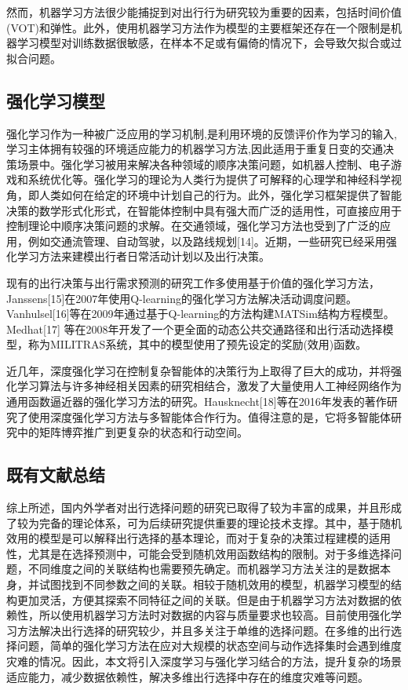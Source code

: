 然而，机器学习方法很少能捕捉到对出行行为研究较为重要的因素，包括时间价值(VOT)和弹性\cite{koushik2020machine}。此外，使用机器学习方法作为模型的主要框架还存在一个限制是机器学习模型对训练数据很敏感，在样本不足或有偏倚的情况下，会导致欠拟合或过拟合问题\cite{singh2016review}。



\subsection{强化学习模型}
强化学习作为一种被广泛应用的学习机制,是利用环境的反馈评价作为学习的输入,学习主体拥有较强的环境适应能力的机器学习方法,因此适用于重复日变的交通决策场景中。强化学习被用来解决各种领域的顺序决策问题，如机器人控制、电子游戏和系统优化等。强化学习的理论为人类行为提供了可解释的心理学和神经科学视角，即人类如何在给定的环境中计划自己的行为。此外，强化学习框架提供了智能决策的数学形式化形式，在智能体控制中具有强大而广泛的适用性，可直接应用于控制理论中顺序决策问题的求解。在交通领域，强化学习方法也受到了广泛的应用，例如交通流管理、自动驾驶，以及路线规划[14]。近期，一些研究已经采用强化学习方法来建模出行者日常活动计划以及出行决策。

现有的出行决策与出行需求预测的研究工作多使用基于价值的强化学习方法，Janssens[15]在2007年使用Q-learning的强化学习方法解决活动调度问题。Vanhulsel[16]等在2009年通过基于Q-learning的方法构建MATSim结构方程模型。Medhat[17] 等在2008年开发了一个更全面的动态公共交通路径和出行活动选择模型，称为MILITRAS系统，其中的模型使用了预先设定的奖励(效用)函数。

近几年，深度强化学习在控制复杂智能体的决策行为上取得了巨大的成功，并将强化学习算法与许多神经相关因素的研究相结合，激发了大量使用人工神经网络作为通用函数逼近器的强化学习方法的研究。Hausknecht[18]等在2016年发表的著作研究了使用深度强化学习方法与多智能体合作行为。值得注意的是，它将多智能体研究中的矩阵博弈推广到更复杂的状态和行动空间。

\subsection{既有文献总结}

综上所述，国内外学者对出行选择问题的研究已取得了较为丰富的成果，并且形成了较为完备的理论体系，可为后续研究提供重要的理论技术支撑。其中，基于随机效用的模型是可以解释出行选择的基本理论，而对于复杂的决策过程建模的适用性，尤其是在选择预测中，可能会受到随机效用函数结构的限制。对于多维选择问题，不同维度之间的关联结构也需要预先确定。而机器学习方法关注的是数据本身，并试图找到不同参数之间的关联。相较于随机效用的模型，机器学习模型的结构更加灵活，方便其探索不同特征之间的关联。但是由于机器学习方法对数据的依赖性，所以使用机器学习方法时对数据的内容与质量要求也较高。目前使用强化学习方法解决出行选择的研究较少，并且多关注于单维的选择问题。在多维的出行选择问题，简单的强化学习方法在应对大规模的状态空间与动作选择集时会遇到维度灾难的情况。因此，本文将引入深度学习与强化学习结合的方法，提升复杂的场景适应能力，减少数据依赖性，解决多维出行选择中存在的维度灾难等问题。

